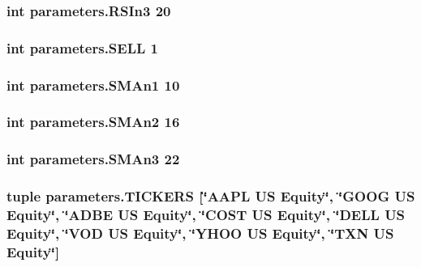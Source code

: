 \hypertarget{namespaceparameters_a14d09dccf8b0b8a8ffaf9bef63888a20}{
\subsubsection[{R\-S\-In3}]{\setlength{\rightskip}{0pt plus 5cm}int parameters.\-R\-S\-In3 20}}\label{namespaceparameters_a14d09dccf8b0b8a8ffaf9bef63888a20}
\hypertarget{namespaceparameters_afc0e08b1e70b5364b401f724e19aaf7f}{
\subsubsection[{S\-E\-L\-L}]{\setlength{\rightskip}{0pt plus 5cm}int parameters.\-S\-E\-L\-L 1}}\label{namespaceparameters_afc0e08b1e70b5364b401f724e19aaf7f}
\hypertarget{namespaceparameters_af58d8069092f06fec36c6bed4b6356b3}{
\subsubsection[{S\-M\-An1}]{\setlength{\rightskip}{0pt plus 5cm}int parameters.\-S\-M\-An1 10}}\label{namespaceparameters_af58d8069092f06fec36c6bed4b6356b3}
\hypertarget{namespaceparameters_af5d7380ac48d89599f8d831470c8daa5}{
\subsubsection[{S\-M\-An2}]{\setlength{\rightskip}{0pt plus 5cm}int parameters.\-S\-M\-An2 16}}\label{namespaceparameters_af5d7380ac48d89599f8d831470c8daa5}
\hypertarget{namespaceparameters_a08bcc064714345f0f21cc9ccb46c1e05}{
\subsubsection[{S\-M\-An3}]{\setlength{\rightskip}{0pt plus 5cm}int parameters.\-S\-M\-An3 22}}\label{namespaceparameters_a08bcc064714345f0f21cc9ccb46c1e05}
\hypertarget{namespaceparameters_a5f32980dc20bf108bea82bedffc53f08}{
\subsubsection[{T\-I\-C\-K\-E\-R\-S}]{\setlength{\rightskip}{0pt plus 5cm}tuple parameters.\-T\-I\-C\-K\-E\-R\-S \mbox{[}\char`\"{}A\-A\-P\-L U\-S Equity\char`\"{}, \char`\"{}G\-O\-O\-G U\-S Equity\char`\"{}, \char`\"{}A\-D\-B\-E U\-S Equity\char`\"{}, \char`\"{}C\-O\-S\-T U\-S Equity\char`\"{}, \char`\"{}D\-E\-L\-L U\-S Equity\char`\"{}, \char`\"{}V\-O\-D U\-S Equity\char`\"{}, \char`\"{}Y\-H\-O\-O U\-S Equity\char`\"{}, \char`\"{}T\-X\-N U\-S Equity\char`\"{}\mbox{]}}}\label{namespaceparameters_a5f32980dc20bf108bea82bedffc53f08}
